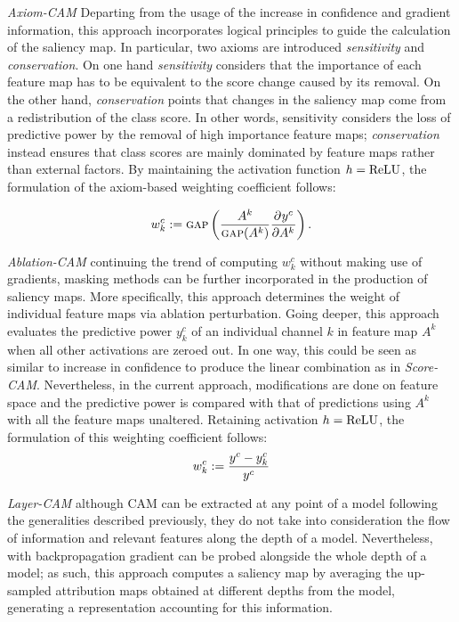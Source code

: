 \noindent \emph{Axiom-CAM} \autocite{axiombased} Departing from the usage of the increase in 
confidence and gradient information, this approach incorporates logical principles to guide the 
calculation of the saliency map. In particular, two axioms are introduced \emph{sensitivity} and 
\emph{conservation}. On one hand \emph{sensitivity} considers that the importance of each feature 
map has to be equivalent to the score change caused by its removal. On the other hand, \emph{conservation} 
points that changes in the saliency map come from a redistribution of the class score. In other 
words, sensitivity considers the loss of predictive power by the removal of high importance 
feature maps; \emph{conservation} instead ensures that class scores are mainly dominated by feature 
maps rather than external factors. By maintaining the activation function $h = {\operatorname{ReLU}}$, the 
formulation of the axiom-based weighting coefficient follows:

\begin{equation}
	w^c_k \mathrel{:=} {\textsc{gap}} \left( \frac{A^k}{{\textsc{gap}}(A^k)}\frac{\partial^{}{y^c}}{\partial{{A^k}^{}}}\right).
	\label{eq:ax_cam}
\end{equation}

\noindent \emph{Ablation-CAM} \autocite{ablationcam} continuing the trend of computing $w^c_k$ 
without making use of gradients, masking methods can be further incorporated in the production of 
saliency maps. More specifically, this approach determines the weight of individual feature maps 
via ablation perturbation. Going deeper, this approach evaluates the predictive power $y^c_k$ of an 
individual channel $k$ in feature map $A^k$ when all other activations are zeroed out. In one way, 
this could be seen as similar to increase in confidence to produce the linear combination as in 
\emph{Score-CAM}. Nevertheless, in the current approach, modifications are done on feature space 
and the predictive power is compared with that of predictions using $A^k$ with all the feature maps 
unaltered. Retaining activation $h = {\operatorname{ReLU}}$, the formulation of this weighting coefficient follows:
\begin{equation}
	w^c_k \mathrel{:=} \frac{y^c-y^c_k}{y^c}
\end{equation}

\noindent \emph{Layer-CAM} \autocite{jiang2021layercam} although CAM can be extracted at any 
point of a model following the generalities described previously, they do not take into 
consideration the flow of information and relevant features along the depth of a model. 
Nevertheless, with backpropagation gradient can be probed alongside the whole depth of a model; as 
such, this approach computes a saliency map by averaging the up-sampled attribution maps obtained at 
different depths from the model, generating a representation accounting for this information.

